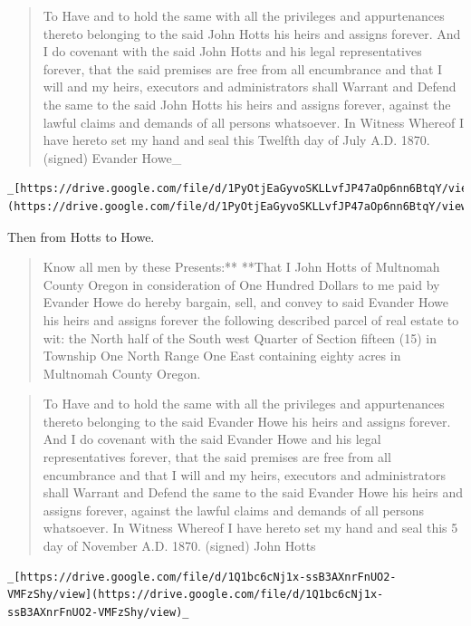\documentclass[
  12pt,
]{book}
\begin{document}
\begin{quote}
To Have and to hold the same with all the privileges and appurtenances thereto belonging to the said John Hotts his heirs and assigns forever. And I do covenant with the said John Hotts and his legal representatives forever, that the said premises are free from all encumbrance and that I will and my heirs, executors and administrators shall Warrant and Defend the same to the said John Hotts his heirs and assigns forever, against the lawful claims and demands of all persons whatsoever. In Witness Whereof I have hereto set my hand and seal this Twelfth day of July A.D. 1870. (signed) Evander Howe\_
\end{quote}

\begin{verbatim}
_[https://drive.google.com/file/d/1PyOtjEaGyvoSKLLvfJP47aOp6nn6BtqY/view](https://drive.google.com/file/d/1PyOtjEaGyvoSKLLvfJP47aOp6nn6BtqY/view)_
\end{verbatim}

Then from Hotts to Howe.

\begin{quote}
Know all men by these Presents:** **That I John Hotts of Multnomah County Oregon in consideration of One Hundred Dollars to me paid by Evander Howe do hereby bargain, sell, and convey to said Evander Howe his heirs and assigns forever the following described parcel of real estate to wit: the North half of the South west Quarter of Section fifteen (15) in Township One North Range One East containing eighty acres in Multnomah County Oregon.
\end{quote}

\begin{quote}
To Have and to hold the same with all the privileges and appurtenances thereto belonging to the said Evander Howe his heirs and assigns forever. And I do covenant with the said Evander Howe and his legal representatives forever, that the said premises are free from all encumbrance and that I will and my heirs, executors and administrators shall Warrant and Defend the same to the said Evander Howe his heirs and assigns forever, against the lawful claims and demands of all persons whatsoever. In Witness Whereof I have hereto set my hand and seal this 5 day of November A.D. 1870. (signed) John Hotts
\end{quote}

\begin{verbatim}
_[https://drive.google.com/file/d/1Q1bc6cNj1x-ssB3AXnrFnUO2-VMFzShy/view](https://drive.google.com/file/d/1Q1bc6cNj1x-ssB3AXnrFnUO2-VMFzShy/view)_
\end{verbatim}
\end{document}
